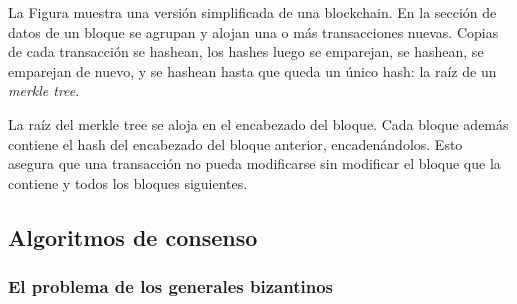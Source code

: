 La Figura muestra una versión simplificada de una blockchain. En la sección de datos de un bloque
se agrupan y alojan una o más transacciones nuevas. Copias de cada transacción se hashean, los hashes luego
se emparejan, se hashean, se emparejan de nuevo, y se hashean hasta que queda un único hash: la raíz de un
\textit{merkle tree}. 

La raíz del merkle tree se aloja en el encabezado del bloque. Cada bloque además contiene el hash del encabezado
del bloque anterior, encadenándolos. Esto asegura que una transacción no pueda modificarse sin modificar el bloque
que la contiene y todos los bloques siguientes.




\subsection{Algoritmos de consenso}\label{subsubsec:consensus}
\subsubsection{El problema de los generales bizantinos}


